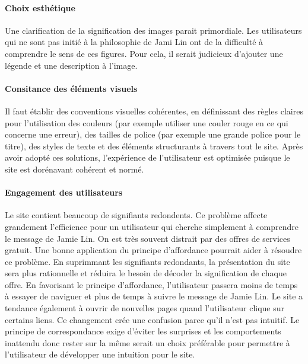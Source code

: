 \documentclass[9pt]{report}
\begin{document}
\begin{multicols*}{2}
\paragraph{Choix esthétique}
Une clarification de la signification des images parait primordiale. Les utilisateurs qui ne sont pas initié à la philosophie de Jami Lin ont de la difficulté à comprendre le sens de ces figures. Pour cela, il serait judicieux d’ajouter une légende et une description à l’image.

\paragraph{Consitance des éléments visuels}
Il faut établir des conventions visuelles cohérentes, en définissant des règles claires pour l’utilisation des couleurs (par exemple utiliser une couler rouge en ce qui concerne une erreur), des tailles de police (par exemple une grande police pour le titre), des styles de texte et des éléments structurants à travers tout le site.
Après avoir adopté ces solutions, l’expérience de l’utilisateur est optimisée puisque le site est dorénavant cohérent et normé.


\paragraph{Engagement des utilisateurs}
Le site contient beaucoup de signifiants redondents. Ce problème affecte grandement l’efficience pour un utilisateur qui cherche simplement à comprendre le message de Jamie Lin. On est très souvent distrait par des offres de services gratuit. Une bonne application du principe d’affordance pourrait aider à résoudre ce problème. En suprimmant les signifiants redondants, la présentation du site sera plus rationnelle et réduira le besoin de décoder la signification de chaque offre. En favorisant le principe d’affordance, l’utilisateur passera moins de temps à essayer de naviguer et plus de temps à suivre le message de Jamie Lin. Le site a tendance également à ouvrir de nouvelles pages 
quand l’utilisateur clique sur certains liens. Ce changement crée une confusion parce qu’il n’est pas intuitif. Le principe de correspondance exige d’éviter les surprises et les comportements inattendu donc rester sur la même serait un choix préférable pour permettre à l’utilisateur de développer une intuition pour le site.


\end{multicols*}
\end{document}
